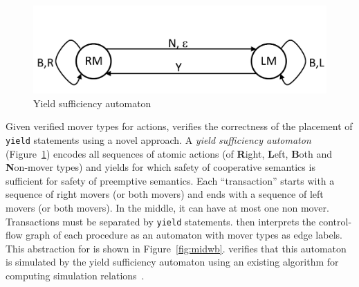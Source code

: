 \begin{figure}
\vspace*{-1.3cm}
\begin{center}
\includegraphics[scale=0.25]{YieldTypeCheckingAutomaton.pdf}
\end{center} 
\vspace*{-0.3cm}
\caption{Yield sufficiency automaton}
\label{fig:ysa}
\end{figure}
Given verified mover types for actions, \civl verifies the correctness of the placement of {\tt yield} statements using a novel approach.
A {\em yield sufficiency automaton\/} (Figure~\ref{fig:ysa})
encodes all sequences of atomic actions (of {\bf R}ight, 
{\bf L}eft,
{\bf B}oth and
{\bf N}on-mover types)  and yields for which safety of cooperative semantics is sufficient 
for safety of preemptive semantics. 
Each ``transaction'' starts with a sequence of right movers (or both movers) and ends with a sequence of left movers (or both movers).
In the middle, it can have at most one non mover. Transactions must be
separated by {\tt yield} statements.
\civl then interprets the control-flow graph of each procedure as an automaton with mover types as edge labels. 
This abstraction for  is shown in Figure~\ref{fig:midwb}.
\civl verifies that this automaton is simulated by the yield sufficiency automaton using an existing algorithm for computing simulation relations~\cite{HenzingerHK95}.

